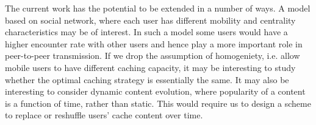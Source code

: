 \documentclass{sig-alternate}
\begin{document}
The current work has the potential to be extended in a number of ways. A model based on social network, where each user has different mobility and centrality characteristics may be of interest. In such a model some users would have a higher encounter rate with other users and hence play a more important role in peer-to-peer transmission. If we drop the assumption of homogeniety, i.e. allow mobile users to have different caching capacity, it may be interesting to study whether the optimal caching strategy is essentially the same. It may also be interesting to consider dynamic content evolution, where popularity of a content is a function of time, rather than static. This would require us to design a scheme to replace or reshuffle users' cache content over time.



\end{document}
